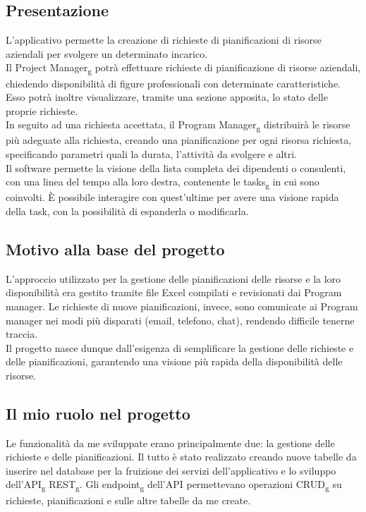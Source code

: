 \subsection{Presentazione}
L'applicativo permette la creazione di richieste di pianificazioni di risorse aziendali per svolgere un determinato incarico.\\
Il Project Manager\textsubscript{g} potrà effettuare richieste di pianificazione di risorse aziendali, chiedendo disponibilità di figure professionali con determinate caratteristiche. Esso potrà inoltre visualizzare, tramite una sezione apposita, lo stato delle proprie richieste.\\
In seguito ad una richiesta accettata, il Program Manager\textsubscript{g} distribuirà le risorse più adeguate alla richiesta, creando una pianificazione per ogni risorsa richiesta, specificando parametri quali la durata, l'attività da svolgere e altri.\\
Il software permette la visione della lista completa dei dipendenti o consulenti, con una linea del tempo alla loro destra, contenente le tasks\textsubscript{g} in cui sono coinvolti. È possibile interagire con quest'ultime per avere una visione rapida della task, con la possibilità di espanderla o modificarla.

\subsection{Motivo alla base del progetto}
L'approccio utilizzato per la gestione delle pianificazioni delle risorse e la loro disponibilità era gestito tramite file Excel compilati e revisionati dai Program manager. Le richieste di nuove pianificazioni, invece, sono comunicate ai Program manager nei modi più disparati (email, telefono, chat), rendendo difficile tenerne traccia.\\
Il progetto nasce dunque dall’esigenza di semplificare la gestione delle richieste e delle pianificazioni, garantendo una visione più rapida della disponibilità delle risorse.

\subsection{Il mio ruolo nel progetto}
Le funzionalità da me sviluppate erano principalmente due: la gestione delle richieste e delle pianificazioni.
Il tutto è stato realizzato creando nuove tabelle da inserire nel database per la fruizione dei servizi dell'applicativo e lo sviluppo dell'API\textsubscript{g} REST\textsubscript{g}. Gli endpoint\textsubscript{g} dell'API permettevano operazioni CRUD\textsubscript{g} su richieste, pianificazioni e sulle altre tabelle da me create.


